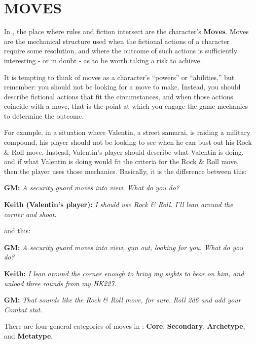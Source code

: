 \documentclass[oneside,10pt]{article}
\begin{document}
\section{MOVES}
\begin{multicols}{2}

In \SW{}, the place where rules and fiction intersect are
the character’s \textbf{Moves}. Moves are the mechanical structure
used when the fictional actions of a character require some
resolution, and where the outcome of such actions is sufficiently interesting - or in doubt - as to be worth taking a risk
to achieve.

It is tempting to think of moves as a character’s “powers” or
“abilities,” but remember: you should not be looking for a
move to make. Instead, you should describe fictional actions
that fit the circumstances, and when those actions coincide
with a move, that is the point at which you engage the game
mechanics to determine the outcome.

For example, in a situation where Valentin, a street samurai, is
raiding a military compound, his player should not be looking
to see when he can bust out his Rock \& Roll move. Instead,
Valentin’s player should describe what Valentin is doing, and
if what Valentin is doing would fit the criteria for the Rock \&
Roll move, then the player uses those mechanics. Basically, it
is the difference between this:
\begin{adjustwidth*}{.5cm}{.5cm}

\textbf{GM:} \textit{A security guard moves into
  view. What do you do?}

\textbf{Keith (Valentin’s player):} \textit{I should use Rock \& Roll. I’ll lean
around the corner and shoot.}
\end{adjustwidth*}

and this:
\begin{adjustwidth*}{.5cm}{.5cm}

\textbf{GM:} \textit{A security guard moves into view, gun out, looking
for you. What do you do?}

\textbf{Keith:} \textit{I lean around the corner enough to bring my sights
to bear on him, and unload three rounds from my
HK227.}

\textbf{GM:} \textit{That sounds like the Rock \& Roll move, for sure. Roll
2d6 and add your Combat stat.}
\end{adjustwidth*}

There are four general categories of moves in
\SW{}: \textbf{Core}, \textbf{Secondary}, \textbf{Archetype}, and
\textbf{Metatype}.


\end{multicols}
\end{document}
